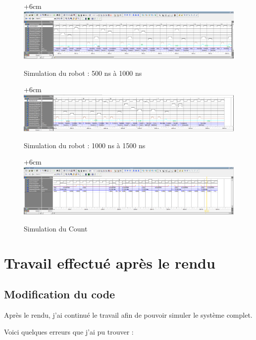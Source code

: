 \documentclass{article}
\begin{document}
\begin{figure}[!h]
\advance\leftskip+6cm
\includegraphics[scale=0.50, angle=-90]{detail_part2.PNG}
\caption{Simulation du robot : 500 ns à 1000 ns}
\end{figure}

\begin{figure}[!h]
\advance\leftskip+6cm
\includegraphics[scale=0.50, angle=-90]{detail_part3.PNG}
\caption{Simulation du robot : 1000 ns à 1500 ns}
\end{figure}

\begin{figure}[!h]
\advance\leftskip+6cm
\includegraphics[scale=0.50, angle=-90]{count.PNG}
\caption{Simulation du Count}
\end{figure}

\newpage

\section{Travail effectué après le rendu}
\subsection{Modification du code}
Après le rendu, j'ai continué le travail afin de pouvoir simuler le système complet.

Voici quelques erreurs que j'ai pu trouver :
\end{document}
